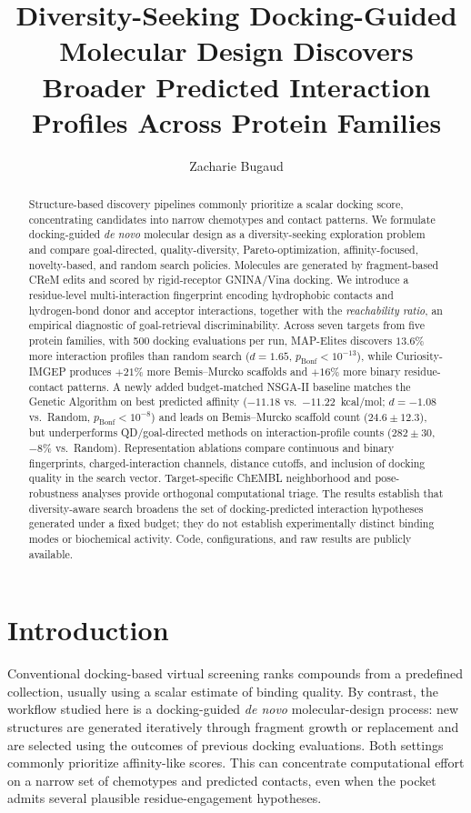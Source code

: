 \documentclass[journal=jcisd8,manuscript=article]{achemso}
\author{Zacharie Bugaud}
\affiliation{Inria, 2 rue Simone Iff, 75012 Paris, France}
\title{Diversity-Seeking Docking-Guided Molecular Design Discovers Broader Predicted Interaction Profiles Across Protein Families}
\begin{document}
\begin{abstract}
Structure-based discovery pipelines commonly prioritize a scalar docking score, concentrating candidates into narrow chemotypes and contact patterns. We formulate docking-guided \emph{de novo} molecular design as a diversity-seeking exploration problem and compare goal-directed, quality-diversity, Pareto-optimization, affinity-focused, novelty-based, and random search policies. Molecules are generated by fragment-based CReM edits and scored by rigid-receptor GNINA/Vina docking. We introduce a residue-level multi-interaction fingerprint encoding hydrophobic contacts and hydrogen-bond donor and acceptor interactions, together with the \emph{reachability ratio}, an empirical diagnostic of goal-retrieval discriminability. Across seven targets from five protein families, with 500 docking evaluations per run, MAP-Elites discovers $13.6\%$ more interaction profiles than random search ($d = 1.65$, $p_{\mathrm{Bonf}} < 10^{-13}$), while Curiosity-IMGEP produces $+21\%$ more Bemis--Murcko scaffolds and $+16\%$ more binary residue-contact patterns. A newly added budget-matched NSGA-II baseline matches the Genetic Algorithm on best predicted affinity ($-11.18$ vs.\ $-11.22$~kcal/mol; $d = -1.08$ vs.\ Random, $p_\mathrm{Bonf} < 10^{-8}$) and leads on Bemis--Murcko scaffold count ($24.6 \pm 12.3$), but underperforms QD/goal-directed methods on interaction-profile counts ($282 \pm 30$, $-8\%$ vs.\ Random). Representation ablations compare continuous and binary fingerprints, charged-interaction channels, distance cutoffs, and inclusion of docking quality in the search vector. Target-specific ChEMBL neighborhood and pose-robustness analyses provide orthogonal computational triage. The results establish that diversity-aware search broadens the set of docking-predicted interaction hypotheses generated under a fixed budget; they do not establish experimentally distinct binding modes or biochemical activity. Code, configurations, and raw results are publicly available.
\end{abstract}

\section{Introduction}

Conventional docking-based virtual screening ranks compounds from a predefined collection, usually using a scalar estimate of binding quality.\cite{kitchen2004docking,lyu2019ultra} By contrast, the workflow studied here is a docking-guided \emph{de novo} molecular-design process: new structures are generated iteratively through fragment growth or replacement and are selected using the outcomes of previous docking evaluations. Both settings commonly prioritize affinity-like scores.\cite{gentile2020deep} This can concentrate computational effort on a narrow set of chemotypes and predicted contacts, even when the pocket admits several plausible residue-engagement hypotheses.\cite{huggins2012binding}
\end{document}
